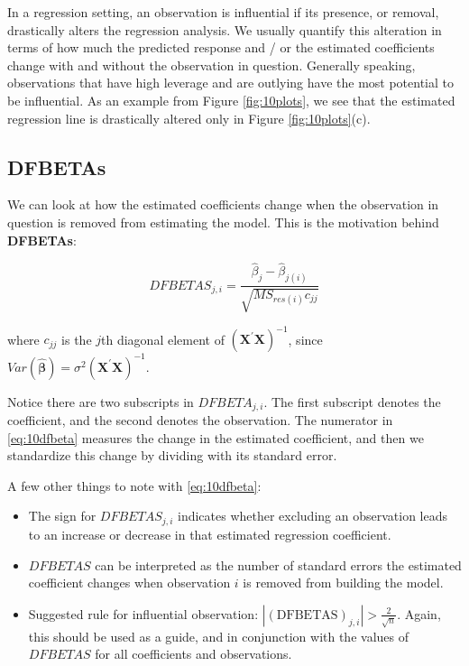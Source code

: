 \documentclass[
]{book}
\providecommand{\tightlist}{%
  \setlength{\itemsep}{0pt}\setlength{\parskip}{0pt}}
\begin{document}
In a regression setting, an observation is influential if its presence, or removal, drastically alters the regression analysis. We usually quantify this alteration in terms of how much the predicted response and / or the estimated coefficients change with and without the observation in question. Generally speaking, observations that have high leverage and are outlying have the most potential to be influential. As an example from Figure \ref{fig:10plots}, we see that the estimated regression line is drastically altered only in Figure \ref{fig:10plots}(c).

\hypertarget{dfbetas}{%
\subsection{DFBETAs}\label{dfbetas}}

We can look at how the estimated coefficients change when the observation in question is removed from estimating the model. This is the motivation behind \textbf{DFBETAs}:

\begin{equation}
DFBETAS_{j,i} = \frac{\hat{\beta}_j-\hat{\beta}_{j(i)}}
{\sqrt{MS_{res(i)}c_{jj}}}
\label{eq:10dfbeta}
\end{equation}

where \(c_{jj}\) is the \(j\)th diagonal element of
\(\left(\boldsymbol{X^{\prime}X}\right)^{-1}\), since \(Var(\boldsymbol{\hat{\beta}}) = \sigma^2 \left(\boldsymbol{X^{\prime}X}\right)^{-1}\).

Notice there are two subscripts in \(DFBETA_{j,i}\). The first subscript denotes the coefficient, and the second denotes the observation. The numerator in \eqref{eq:10dfbeta} measures the change in the estimated coefficient, and then we standardize this change by dividing with its standard error.

A few other things to note with \eqref{eq:10dfbeta}:

\begin{itemize}
\tightlist
\item
  The sign for \(DFBETAS_{j,i}\) indicates whether excluding an observation leads to an increase or decrease in that estimated regression coefficient.
\item
  \(DFBETAS\) can be interpreted as the number of standard errors the estimated coefficient changes when observation \(i\) is removed from building the model.
\item
  Suggested rule for influential observation: \(|(\mbox{DFBETAS})_{j,i}|>\frac{2}{\sqrt{n}}\). Again, this should be used as a guide, and in conjunction with the values of \(DFBETAS\) for all coefficients and observations.
\end{itemize}
\end{document}
